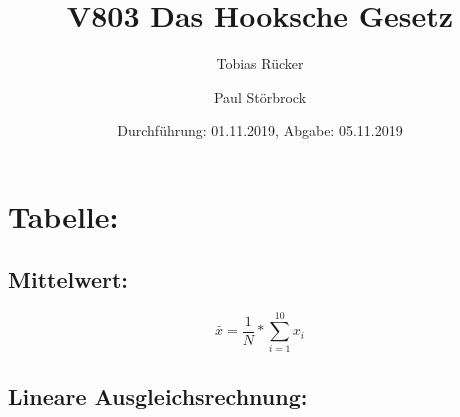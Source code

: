 

\title{V803 Das Hooksche Gesetz}
\author{Tobias Rücker \and Paul Störbrock}
\date{Durchführung: 01.11.2019, Abgabe: 05.11.2019}


\maketitle


\newpage
\section{Tabelle:}   
\begin{table}
    \centering
    \label{tab:data}
       
\end{table}
    \subsection{Mittelwert:}
    \begin{equation}
        \bar{x} = \frac{1}{N}*\sum\limits_{i=1}^{10} {x_i}
    \end{equation}

    \subsection{Lineare Ausgleichsrechnung:}
